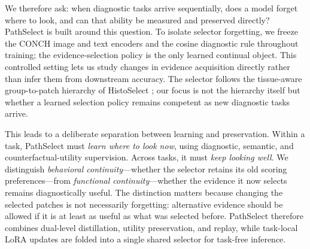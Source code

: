 \documentclass{article}
\begin{document}
We therefore ask: when diagnostic tasks arrive sequentially, does a model forget where to look, and can that ability be measured and preserved directly? PathSelect is built around this question. To isolate selector forgetting, we freeze the CONCH image and text encoders \cite{lu2024conch} and the cosine diagnostic rule throughout training; the evidence-selection policy is the only learned continual object. This controlled setting lets us study changes in evidence acquisition directly rather than infer them from downstream accuracy. The selector follows the tissue-aware group-to-patch hierarchy of HistoSelect \cite{huang2026histoselect}; our focus is not the hierarchy itself but whether a learned selection policy remains competent as new diagnostic tasks arrive.

This leads to a deliberate separation between learning and preservation. Within a task, PathSelect must \emph{learn where to look now}, using diagnostic, semantic, and counterfactual-utility supervision. Across tasks, it must \emph{keep looking well}. We distinguish \emph{behavioral continuity}---whether the selector retains its old scoring preferences---from \emph{functional continuity}---whether the evidence it now selects remains diagnostically useful. The distinction matters because changing the selected patches is not necessarily forgetting: alternative evidence should be allowed if it is at least as useful as what was selected before. PathSelect therefore combines dual-level distillation, utility preservation, and replay, while task-local LoRA updates are folded into a single shared selector for task-free inference.
\end{document}
